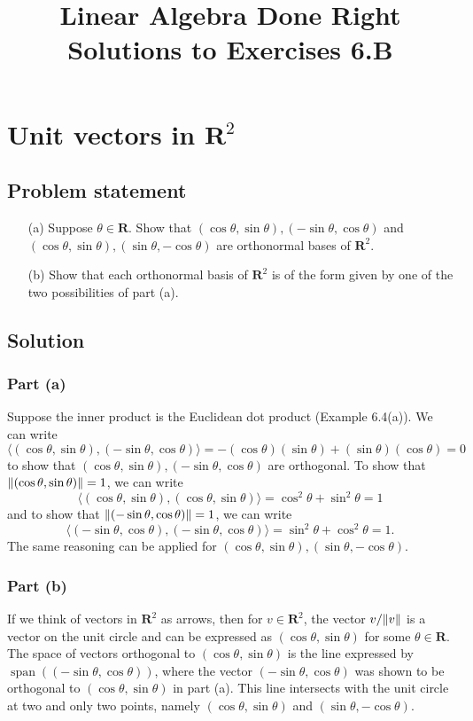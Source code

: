 \documentclass{article}
\title{Linear Algebra Done Right\\Solutions to Exercises 6.B}
\author{}
\date{}
\begin{document}
\maketitle

\section{Unit vectors in $\mathbf{R}^2$}
\subsection*{Problem statement}
\begin{itemize}
    \item[(a)] Suppose $\theta\in\mathbf{R}$. Show that $(\cos\theta,\sin\theta),(-\sin\theta,\cos\theta)$ and \newline$(\cos\theta,\sin\theta),(\sin\theta,-\cos\theta)$ are orthonormal bases of $\mathbf{R}^2$.
    \item[(b)] Show that each orthonormal basis of $\mathbf{R}^2$ is of the form given by one of the two possibilities of part (a).
\end{itemize}

\subsection*{Solution}
\subsubsection*{Part (a)}
Suppose the inner product is the Euclidean dot product (Example 6.4(a)). 
We can write
\[\langle (\cos\theta,\sin\theta), (-\sin\theta,\cos\theta)\rangle=-(\cos\theta)(\sin\theta)+(\sin\theta)(\cos\theta)=0\]
to show that $(\cos\theta,\sin\theta),(-\sin\theta,\cos\theta)$ are orthogonal. 
To show that \newline$\lVert(\cos\theta,\sin\theta)\rVert=1$, we can write
\[\langle (\cos\theta,\sin\theta), (\cos\theta,\sin\theta)\rangle=\cos^2\theta+\sin^2\theta=1\]
and to show that $\lVert(-\sin\theta,\cos\theta)\rVert=1$, we can write
\[\langle (-\sin\theta,\cos\theta), (-\sin\theta,\cos\theta)\rangle=\sin^2\theta+\cos^2\theta=1.\]
The same reasoning can be applied for $(\cos\theta,\sin\theta),(\sin\theta,-\cos\theta)$.

\subsubsection*{Part (b)}
If we think of vectors in $\mathbf{R}^2$ as arrows, then for $v\in\mathbf{R}^2$, the vector $v/\lVert v\rVert$ is a vector on the unit circle and can be expressed as $(\cos\theta,\sin\theta)$ for some $\theta\in\mathbf{R}$. 
The space of vectors orthogonal to $(\cos\theta,\sin\theta)$ is the line expressed by $\operatorname{span}((-\sin\theta,\cos\theta))$, where the vector $(-\sin\theta,\cos\theta)$ was shown to be orthogonal to $(\cos\theta,\sin\theta)$ in part (a). 
This line intersects with the unit circle at two and only two points, namely $(\cos\theta,\sin\theta)$ and $(\sin\theta,-\cos\theta)$.
\end{document}
